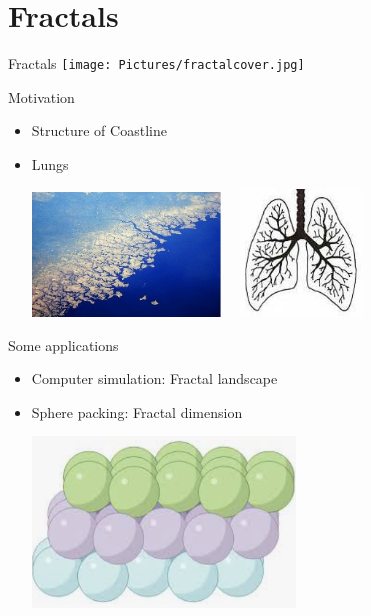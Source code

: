 \section{Fractals}

\begin{frame}{Fractals}
	\centering
	\texttt{[image: Pictures/fractalcover.jpg]}
	\end{frame}
	
	\begin{frame}{Motivation}
	\begin{itemize}
		\item Structure of Coastline
		\item Lungs
		
		\centering
		\includegraphics[width = 5cm]{Pictures/coastline.jpg}
		\includegraphics[height = 3.4cm, width  = 4cm]{Pictures/lungs.jpg}
	\end{itemize}
	\end{frame}
	
	\begin{frame}{Some applications}
		\begin{itemize}
			\item Computer simulation: Fractal landscape
			\item Sphere packing: Fractal dimension
	
			\centering
			\includegraphics[width=7cm]{Pictures/spherepacking.png}
		\end{itemize}
	\end{frame}


